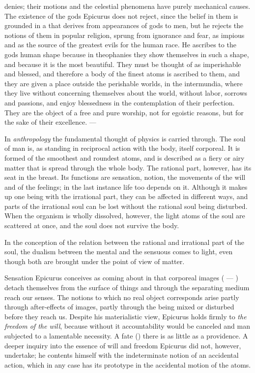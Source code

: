 denies; their motions and the celestial phenomena have purely
mechanical causes. The existence of the gods Epicurus does not reject,
since the belief in them is grounded in a  that derives
from appearances of gods to men, but he rejects the notions of them in
popular religion, sprung from ignorance and fear, as impious and as the
source of the greatest evils for the human race. He ascribes to the
gods human shape because in theophanies they show themselves in such a
shape, and because it is the most beautiful. They must be thought of as
imperishable and blessed, and therefore a body of the finest atoms is
ascribed to them, and they are given a place outside the perishable
worlds, in the intermundia, where they live without concerning
themselves about the world, without labor, sorrows and passions, and
enjoy blessedness in the contemplation of their perfection. They are
the object of a free and pure worship, not for egoistic reasons, but
for the sake of their excellence. ---

In \emph{anthropology} the fundamental thought of physics is carried
through. The soul of man is, as standing in reciprocal action with the
body, itself corporeal. It is formed of the smoothest and roundest
atoms, and is described as a fiery or airy matter that is spread
through the whole body. The rational part, however, has its seat in the
breast. Its functions are sensation, notion, the movements of the will
and of the feelings; in the last instance life too depends on it.
Although it makes up one being with the irrational part, they can be
affected in different ways, and parts of the irrational soul can be
lost without the rational soul being disturbed. When the organism is
wholly dissolved, however, the light atoms of the soul are scattered at
once, and the soul does not survive the body.

In the conception of the relation between the rational and irrational
part of the soul, the dualism between the mental and the sensuous comes
to light, even though both are brought under the point of view of
matter.

Sensation Epicurus conceives as coming about in that corporeal images
( --- ) detach themselves from the
surface of things and through the separating medium reach
our senses. The notions to which no real object corresponds arise
partly through after-effects of images, partly through the
 being mixed or disturbed before they reach us. Despite his
materialistic view, Epicurus holds firmly to \emph{the freedom of the
will}, because without it accountability would be canceled and man
subjected to a lamentable necessity. A fate () there is
as little as a providence. A deeper inquiry into the essence of will and
freedom Epicurus did not, however, undertake; he contents himself with
the indeterminate notion of an accidental action, which in any case has
its prototype in the accidental motion of the atoms.

